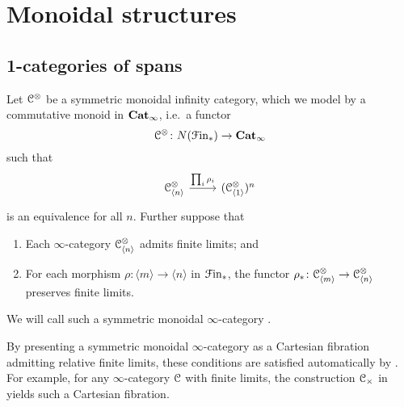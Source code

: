 \documentclass[main.tex]{subfiles}
\begin{document}
\section{Monoidal structures}
\label{sec:monoidal_structures}

\subsection{1-categories of spans}
\label{ssc:1_categories_of_spans}

Let $\mathcal{C}^{\otimes}$ be a symmetric monoidal infinity category, which we model by a commutative monoid in $\mathbf{Cat}_{\infty}$, i.e.\ a functor
\begin{equation*}
  \mathcal{C}^{\otimes}\colon N(\mathcal{F}\mathrm{in}_{*}) \to \mathbf{Cat}_{\infty}
\end{equation*}
such that
\begin{equation*}
  \begin{tikzcd}
    \category{C}^{\otimes}_{\langle n \rangle}
    \arrow[r, "\prod_{i} \rho_{i}"]
    & (\category{C}^{\otimes}_{\langle 1 \rangle})^{n}
  \end{tikzcd}
\end{equation*}
is an equivalence for all $n$. Further suppose that
\begin{enumerate}
  \item Each $\infty$-category $\mathcal{C}^{\otimes}_{\langle n \rangle}$ admits finite limits; and

  \item For each morphism $\rho\colon \langle m \rangle \to \langle n \rangle$ in $\mathcal{F}\mathrm{in}_{*}$, the functor $\rho_{*}\colon \mathcal{C}^{\otimes}_{\langle m \rangle} \to \mathcal{C}^{\otimes}_{\langle n \rangle}$ preserves finite limits.
\end{enumerate}

\begin{definition}
  We will call such a symmetric monoidal $\infty$-category .
\end{definition}

\begin{note}
  By presenting a symmetric monoidal $\infty$-category as a Cartesian fibration admitting relative finite limits, these conditions are satisfied automatically by \cite[Prop. 4.3.1.10]{highertopostheory}. For example, for any $\infty$-category $\mathcal{C}$ with finite limits, the construction $\mathcal{C}_{\times}$ in \cite{spectralmackeyfunctors2} yields such a Cartesian fibration.
\end{note}
\end{document}
